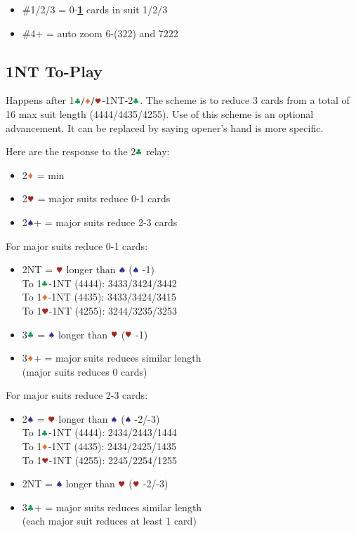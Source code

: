 \documentclass{article}
\begin{document}
\begin{multicols}{2}
\begin{itemize}
    \item \#1/2/3 = 0-\textbf{\underline{1}} cards in suit 1/2/3
    \item \#4+ = auto zoom 6-(322) and 7222
\end{itemize}

\subsection{1NT To-Play}\label{sec:1nt-to-play}
Happens after 1$\ccc/\ddd/\hhh$-1NT-2$\ccc$. The scheme is to reduce 3 cards from a total of 16 max suit length (4444/4435/4255). Use of this scheme is an optional advancement. It can be replaced by saying opener's hand is more specific.

\columnbreak

\noindent Here are the response to the 2$\ccc$ relay:
\begin{itemize}
    \item 2$\ddd$ = min
    \item 2$\hhh$ = major suits reduce 0-1 cards
    \item 2$\sss$+ = major suits reduce 2-3 cards
\end{itemize}

\noindent For major suits reduce 0-1 cards:
\begin{itemize}
    \item 2NT = $\hhh$ longer than $\sss$ ($\sss$ -1) \\
        To 1$\ccc$-1NT (4444): 3433/3424/3442 \\
        To 1$\ddd$-1NT (4435): 3433/3424/3415 \\
        To 1$\hhh$-1NT (4255): 3244/3235/3253
    \item 3$\ccc$ = $\sss$ longer than $\hhh$ ($\hhh$ -1)
    \item 3$\ddd$+ = major suits reduces similar length \\
        (major suits reduces 0 cards)
\end{itemize}

\noindent For major suits reduce 2-3 cards:
\begin{itemize}
    \item 2$\sss$ = $\hhh$ longer than $\sss$ ($\sss$ -2/-3) \\
        To 1$\ccc$-1NT (4444): 2434/2443/1444 \\
        To 1$\ddd$-1NT (4435): 2434/2425/1435 \\
        To 1$\hhh$-1NT (4255): 2245/2254/1255
    \item 2NT = $\sss$ longer than $\hhh$ ($\hhh$ -2/-3)
    \item 3$\ccc$+ = major suits reduces similar length \\
        (each major suit reduces at least 1 card)
\end{itemize}


\end{multicols}
\end{document}
